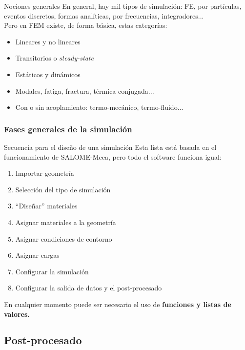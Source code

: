 \documentclass[12pt]{beamer}
\begin{document}
\begin{frame}{Nociones generales}
	En general, hay mil tipos de simulación: FE, por partículas, eventos discretos, formas analíticas, por frecuencias, integradores... \\
	Pero en FEM existe, de forma básica, estas categorías:
	\begin{itemize}
		\item Lineares y no lineares
		\item Transitorios o \textit{steady-state}
		\item Estáticos y dinámicos
		\item Modales, fatiga, fractura, térmica conjugada...
		\item Con o sin acoplamiento: termo-mecánico, termo-fluido...
	\end{itemize}
\end{frame}

\subsubsection{Fases generales de la simulación}

\begin{frame}{Secuencia para el diseño de una simulación}
	Esta lista está basada en el funcionamiento de SALOME-Meca, pero todo el software funciona igual:
	\begin{enumerate}
		\item Importar geometría
		\item Selección del tipo de simulación
		\item ``Diseñar'' materiales
		\item Asignar materiales a la geometría
		\item Asignar condiciones de contorno
		\item Asignar cargas
		\item Configurar la simulación
		\item Configurar la salida de datos y el post-procesado
	\end{enumerate}
	En cualquier momento puede ser necesario el uso de \textbf{funciones y listas de valores.} 
\end{frame}

\subsection{Post-procesado}
\end{document}
